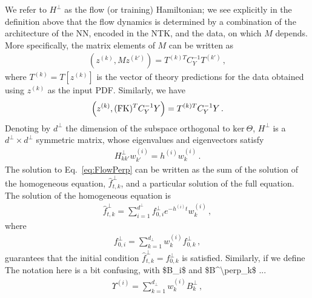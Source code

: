 We refer to $H^\perp$ as the flow (or training) Hamiltonian; we see explicitly in the definition above that
the flow dynamics is determined by a combination of the architecture of the NN, encoded in the NTK, and the
data, on which $M$ depends. More specifically, the matrix elements of $M$ can be written as
\begin{align}
    \label{eq:MMatElems}
    \left(z^{(k)}, M z^{(k')}\right) = T^{(k)T} C_Y^{-1} T^{(k')}\, ,
\end{align}
where $T^{(k)} = T[z^{(k)}]$ is the vector of theory predictions for the data obtained using $z^{(k)}$ as the
input PDF. Similarly, we have
\begin{align}
    \label{eq:BMatElems}
    \left(z^{(k)}, (\mathrm{FK})^T C_Y^{-1} Y\right) = T^{(k)T} C_Y^{-1} Y\, .
\end{align}
Denoting by $d^\perp$ the dimension of the subspace orthogonal to $\text{ker}\ \Theta$, $H^\perp$ is
a $d^\perp\times d^\perp$ symmetric matrix, whose eigenvalues and eigenvectors satisfy
\begin{align}
    H^\perp_{kk'} w^{(i)}_{k'} = h^{(i)} w^{(i)}_{k}\, .
\end{align}
The solution to Eq.~\eqref{eq:FlowPerp} can be written as the sum of the solution of the
homogeneous equation, $\hat{f}^{\perp}_{t,k}$, and a particular solution of the full equation.
The solution of the homogeneous equation is
\begin{align}
    \label{eq:HomoSoln}
    \hat{f}^{\perp}_{t,k} = \sum_{i=1}^{d^\perp} f^{\perp}_{0,i} e^{-h^{(i)}t} w^{(i)}_k\, ,
\end{align}
where
\begin{align}
    \label{eq:InitialCi}
    f^{\perp}_{0,i} = \sum_{k=1}^{d_\perp} w^{(i)}_k f^\perp_{0,k}\, ,
\end{align}
guarantees that the initial condition $\hat{f}^\perp_{t,k}=f^\perp_{0,k}$ is
satisfied. Similarly, if we define
\ac{The notation here is a bit confusing, with $B_i$ and $B^\perp_k$ ...}
\begin{align}
    \label{eq:BiDef}
    \Upsilon^{(i)} = \sum_{k=1}^{d_\perp} w^{(i)}_k B^\perp_{k}\, ,
\end{align}
